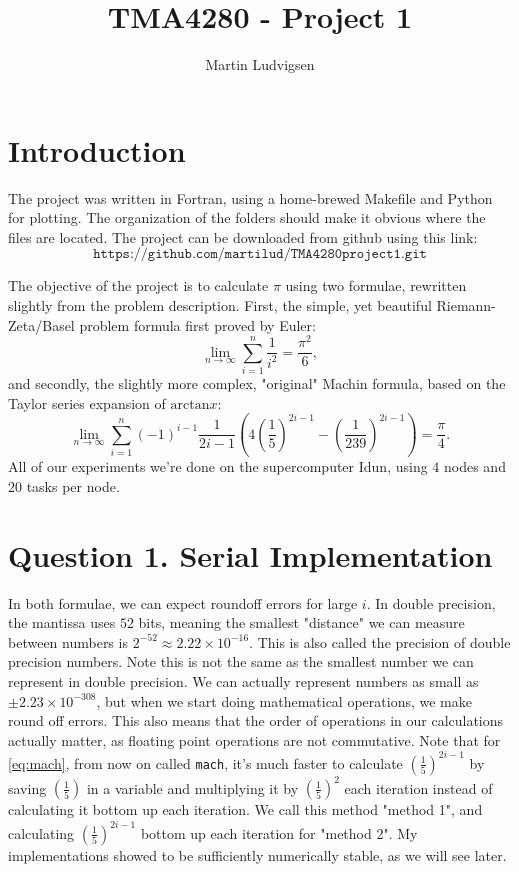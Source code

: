 \documentclass[12pt]{article}
\author{Martin Ludvigsen}
\title{TMA4280 - Project 1}
\begin{document}
\maketitle
\section{Introduction}
The project was written in Fortran, using a home-brewed Makefile and Python for plotting. The organization of the folders
should make it obvious where the files are located. The project can be downloaded from github using this link:
\begin{equation*}
    \texttt{https://github.com/martilud/TMA4280project1.git}
\end{equation*}

The objective of the project is to calculate $\pi$ using two formulae, rewritten slightly from the problem description. First, the simple, yet beautiful Riemann-Zeta/Basel problem formula
first proved by Euler:
\begin{equation}
    \lim_{n \rightarrow \infty} \sum_{i = 1}^n \frac{1}{i^2} = \frac{\pi^2}{6},
    \label{eq:zeta}
\end{equation}
and secondly, the slightly more complex, "original" Machin formula, based on the Taylor series expansion of $\text{arctan} x$:
\begin{equation}
    \lim_{n \rightarrow \infty} \sum_{i = 1}^n (-1)^{i-1} \frac{1}{2i-1}\left(4 \left(\frac{1}{5}\right)^{2i-1} - \left(\frac{1}{239}\right)^{2i-1}\right) = \frac{\pi}{4}.
    \label{eq:mach}
\end{equation}
All of our experiments we're done on the supercomputer Idun, using $4$ nodes and $20$ tasks per node.

\section{Question 1. Serial Implementation}
In both formulae, we can expect roundoff errors for large $i$. In double precision, the mantissa uses $52$ bits, meaning the smallest "distance" we can measure
between numbers is $2^{-52} \approx 2.22 \times 10^{-16}$. This is also called the precision of double precision numbers.
Note this is not the same as the smallest number we can represent in double precision. We can actually represent numbers as small as
$\pm 2.23 \times 10^{-308}$, but when we start doing mathematical operations, we make round off errors. 
This also means that the order of operations in our calculations actually matter, as floating point operations are not commutative.
Note that for \eqref{eq:mach}, from now on called \texttt{mach},
it's much faster to calculate $\left(\frac{1}{5}\right)^{2i-1}$ by saving $\left(\frac{1}{5}\right)$ in a variable and multiplying it by 
$\left(\frac{1}{5}\right)^2$ each iteration instead of calculating it bottom up each iteration. We call this method "method 1", and calculating $\left(\frac{1}{5}\right)^{2i-1}$ bottom up
each iteration for "method 2".
My implementations showed to be sufficiently numerically stable, as we will see later. 
\end{document}
